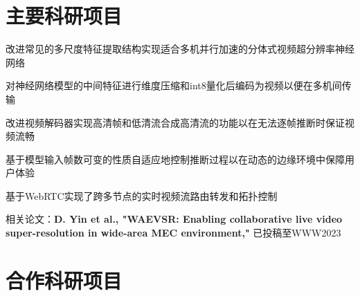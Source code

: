\documentclass[]{deedy-resume-openfont}
\begin{document}
\begin{minipage}[t]{0.77\textwidth}


	\section{主要科研项目}
	\vspace{\topsep}
	\begin{tightemize}
		\item 改进常见的多尺度特征提取结构实现适合多机并行加速的分体式视频超分辨率神经网络
		\item 对神经网络模型的中间特征进行维度压缩和int8量化后编码为视频以便在多机间传输
		\item 改进视频解码器实现高清帧和低清流合成高清流的功能以在无法逐帧推断时保证视频流畅
		\item 基于模型输入帧数可变的性质自适应地控制推断过程以在动态的边缘环境中保障用户体验
		\item 基于WebRTC实现了跨多节点的实时视频流路由转发和拓扑控制
		\item 相关论文：{\bfseries D. Yin et al., "WAEVSR: Enabling collaborative live video super-resolution in wide-area MEC environment,"} 已投稿至WWW2023
	\end{tightemize}
    \sectionsep

	\section{合作科研项目}
	

\end{minipage}
\end{document}
